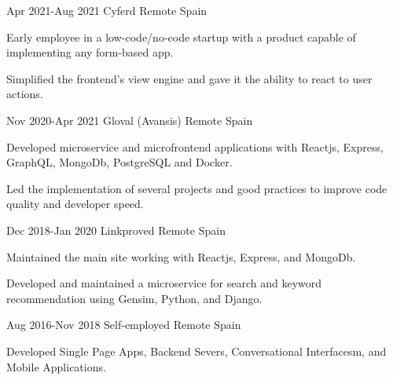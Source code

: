 \documentclass[10pt]{CurriculumVitae}
\begin{document}
      {Apr 2021-Aug 2021}
      {Cyferd}
      {Remote}
      {Spain}
      {
        \item Early employee in a low-code/no-code startup with a product capable of implementing any form-based app.
        \item Simplified the frontend's view engine and gave it the ability to react to user actions.
      }

      {Nov 2020-Apr 2021}
      {Gloval (Avansis)}
      {Remote}
      {Spain}
      {
        \item Developed microservice and microfrontend applications with Reactjs, Express, GraphQL, MongoDb, PostgreSQL and Docker.
        \item Led the implementation of several projects and good practices to improve code quality and developer speed. %
      }

      {Dec 2018-Jan 2020}
      {Linkproved}
      {Remote}
      {Spain}
      {
        \item Maintained the main site working with Reactjs, Express, and MongoDb.
        \item Developed and maintained a microservice for search and keyword recommendation using Gensim, Python, and Django.
      }
 
      {Aug 2016-Nov 2018}
      {Self-employed}
      {Remote}
      {Spain}
      {
        \item Developed Single Page Apps, Backend Severs, Conversational Interfacesm, and Mobile Applications.
      }
   
\end{document}
